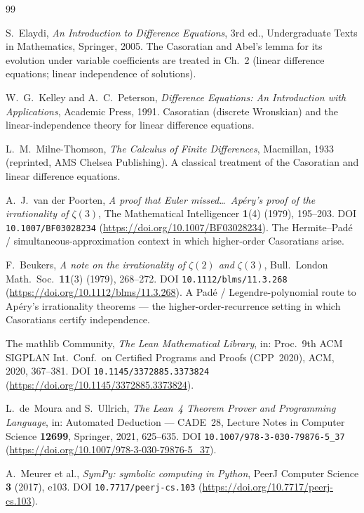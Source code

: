 \documentclass[11pt]{article}
\begin{document}
\begin{thebibliography}{99}

S.~Elaydi,
\emph{An Introduction to Difference Equations}, 3rd ed.,
Undergraduate Texts in Mathematics, Springer, 2005.
The Casoratian and Abel's lemma for its evolution under variable coefficients are
treated in Ch.~2 (linear difference equations; linear independence of solutions).

W.~G.~Kelley and A.~C.~Peterson,
\emph{Difference Equations: An Introduction with Applications},
Academic Press, 1991. Casoratian (discrete Wronskian) and the linear-independence
theory for linear difference equations.

L.~M.~Milne-Thomson,
\emph{The Calculus of Finite Differences},
Macmillan, 1933 (reprinted, AMS Chelsea Publishing).
A classical treatment of the Casoratian and linear difference equations.

A.~J.~van der Poorten,
\emph{A proof that Euler missed\ldots\ Ap\'ery's proof of the irrationality of
$\zeta(3)$},
The Mathematical Intelligencer \textbf{1}(4) (1979), 195--203.
DOI \texttt{10.1007/BF03028234} (\url{https://doi.org/10.1007/BF03028234}).
The Hermite--Pad\'e / simultaneous-approximation context in which higher-order
Casoratians arise.

F.~Beukers,
\emph{A note on the irrationality of $\zeta(2)$ and $\zeta(3)$},
Bull.\ London Math.\ Soc.\ \textbf{11}(3) (1979), 268--272.
DOI \texttt{10.1112/blms/11.3.268} (\url{https://doi.org/10.1112/blms/11.3.268}).
A Pad\'e / Legendre-polynomial route to Ap\'ery's irrationality theorems --- the
higher-order-recurrence setting in which Casoratians certify independence.

The mathlib Community,
\emph{The Lean Mathematical Library},
in: Proc.\ 9th ACM SIGPLAN Int.\ Conf.\ on Certified Programs and Proofs (CPP~2020),
ACM, 2020, 367--381. DOI \texttt{10.1145/3372885.3373824}
(\url{https://doi.org/10.1145/3372885.3373824}).

L.~de~Moura and S.~Ullrich,
\emph{The Lean~4 Theorem Prover and Programming Language},
in: Automated Deduction --- CADE~28, Lecture Notes in Computer Science \textbf{12699},
Springer, 2021, 625--635. DOI \texttt{10.1007/978-3-030-79876-5\_37}
(\url{https://doi.org/10.1007/978-3-030-79876-5_37}).

A.~Meurer et al.,
\emph{SymPy: symbolic computing in Python},
PeerJ Computer Science \textbf{3} (2017), e103.
DOI \texttt{10.7717/peerj-cs.103} (\url{https://doi.org/10.7717/peerj-cs.103}).


\end{thebibliography}
\end{document}
